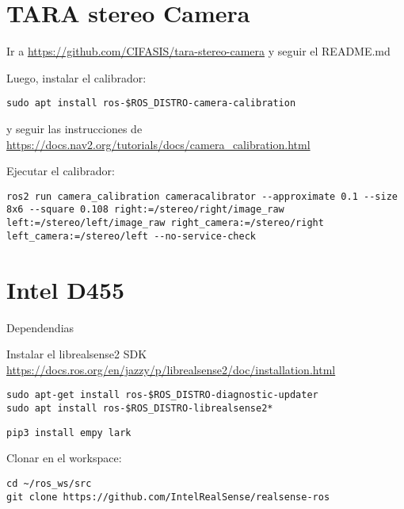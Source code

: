 \documentclass[apunte]{lcc}
\begin{document}
\maketitle

\section{TARA stereo Camera}

Ir a \url{https://github.com/CIFASIS/tara-stereo-camera} y seguir el README.md

Luego, instalar el calibrador:

\begin{lstlisting}[style=bash]
sudo apt install ros-$ROS_DISTRO-camera-calibration
\end{lstlisting}

y seguir las instrucciones de \url{https://docs.nav2.org/tutorials/docs/camera_calibration.html}

Ejecutar el calibrador:

\begin{lstlisting}[style=bash]
ros2 run camera_calibration cameracalibrator --approximate 0.1 --size 8x6 --square 0.108 right:=/stereo/right/image_raw left:=/stereo/left/image_raw right_camera:=/stereo/right left_camera:=/stereo/left --no-service-check
\end{lstlisting}


\section{Intel D455}

Dependendias

Instalar el librealsense2 SDK \url{https://docs.ros.org/en/jazzy/p/librealsense2/doc/installation.html}

\begin{lstlisting}[style=bash]
sudo apt-get install ros-$ROS_DISTRO-diagnostic-updater
sudo apt install ros-$ROS_DISTRO-librealsense2*
\end{lstlisting}

\begin{lstlisting}[style=bash]
pip3 install empy lark
\end{lstlisting}

Clonar en el workspace:
\begin{lstlisting}[style=bash]
cd ~/ros_ws/src
git clone https://github.com/IntelRealSense/realsense-ros
\end{lstlisting}
\end{document}
